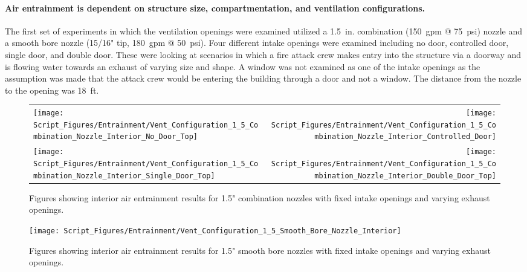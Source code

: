 \documentclass{article}
\begin{document}
\clearpage

\paragraph{Air entrainment is dependent on structure size, compartmentation, and ventilation configurations.} \mbox{}

The first set of experiments in which the ventilation openings were examined utilized a 1.5~in. combination (150~gpm @ 75~psi) nozzle and a smooth bore nozzle (15/16" tip, 180~gpm @ 50~psi). Four different intake openings were examined including no door, controlled door, single door, and double door. These were looking at scenarios in which a fire attack crew makes entry into the structure via a doorway and is flowing water towards an exhaust of varying size and shape. A window was not examined as one of the intake openings as the assumption was made that the attack crew would be entering the building through a door and not a window. The distance from the nozzle to the opening was 18~ft.

\begin{figure}[!ht]
\begin{tabular*}{\textwidth}{lr}
\texttt{[image: Script\_Figures/Entrainment/Vent\_Configuration\_1\_5\_Combination\_Nozzle\_Interior\_No\_Door\_Top]} &
\texttt{[image: Script\_Figures/Entrainment/Vent\_Configuration\_1\_5\_Combination\_Nozzle\_Interior\_Controlled\_Door]} \\
\texttt{[image: Script\_Figures/Entrainment/Vent\_Configuration\_1\_5\_Combination\_Nozzle\_Interior\_Single\_Door\_Top]} &
\texttt{[image: Script\_Figures/Entrainment/Vent\_Configuration\_1\_5\_Combination\_Nozzle\_Interior\_Double\_Door\_Top]} \\
\end{tabular*}
\caption{Figures showing interior air entrainment results for 1.5" combination nozzles with fixed intake openings and varying exhaust openings.}
\label{fig:1_5_Interior_Combination_Vents}
\end{figure}

\clearpage

\begin{figure}[!ht]
\centering
\texttt{[image: Script\_Figures/Entrainment/Vent\_Configuration\_1\_5\_Smooth\_Bore\_Nozzle\_Interior]}
\caption{Figures showing interior air entrainment results for 1.5" smooth bore nozzles with fixed intake openings and varying exhaust openings.}
\label{fig:1_5_Interior_Smooth_Bore_Vents}
\end{figure}
\end{document}
